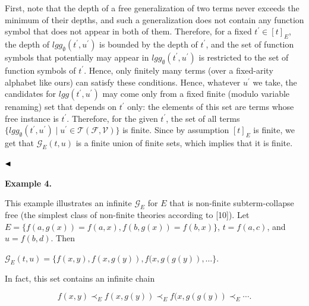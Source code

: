 First, note that the depth of a free generalization of two terms never exceeds the minimum of their depths, and such a generalization does not contain any function symbol that does not appear in both of them. Therefore, for a fixed $t^{\prime}\in[t]_{E}$, the depth of $\mathit{lgg}_{\emptyset}(t^{\prime},u^{\prime})$ is bounded by the depth of $t^{\prime}$, and the set of function symbols that potentially may appear in $\mathit{lgg}_{\emptyset}(t^{\prime},u^{\prime})$ is restricted to the set of function symbols of $t^{\prime}$. Hence, only finitely many terms (over a fixed-arity alphabet like ours) can satisfy these conditions. Hence, whatever $u^{\prime}$ we take, the candidates for $\mathit{lgg}(t^{\prime},u^{\prime})$ may come only from a fixed finite (modulo variable renaming) set that depends on $t^{\prime}$ only: the elements of this set are terms whose free instance is $t^{\prime}$. Therefore, for the given $t^{\prime}$, the set of all terms $\{\mathit{lgg}_{\emptyset}(t^{\prime},u^{\prime})\mid u^{\prime}\in\mathcal{T}(\mathcal{F},\mathcal{V})\}$ is finite. Since by assumption $[t]_{E}$ is finite, we get that $\mathcal{G}_{E}(t,u)$ is a finite union of finite sets, which implies that it is finite.\par
 
 
  
$\hfill\blacktriangleleft$\par
 
 
 
\par\medskip\noindent\textbf{Example 4.}\par
 
 
This example illustrates an infinite $\mathcal{G}_{E}$ for $E$ that is non-finite subterm-collapse free (the simplest class of non-finite theories according to [10]). Let $E=\{f(a,g(x))=f(a,x),f(b,g(x))=f(b,x)\}$, $t=f(a,c)$, and $u=f(b,d)$. Then\par
  
\par  \quad  $\displaystyle\mathcal{G}_{E}(t,u)=\{f(x,y),f(x,g(y)),f(x,g(g(y)),\ldots\}.$\quad  \quad  
  
In fact, this set contains an infinite chain\par
  
\par  \quad  \[f(x,y)\prec_{E}f(x,g(y))\prec_{E}f(x,g(g(y))\prec_{E}\cdots.\]\quad  \quad  
  
